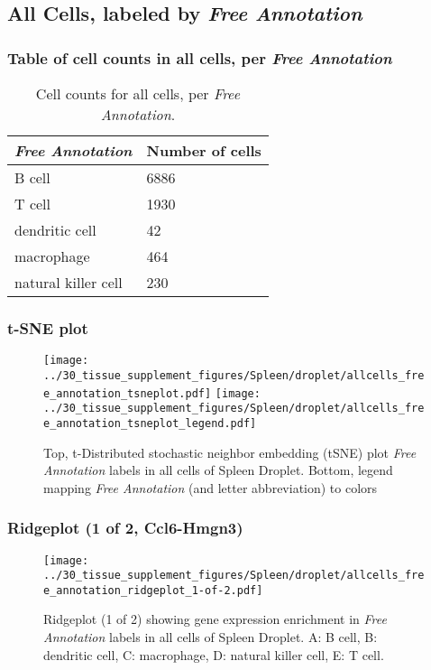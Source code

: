 \clearpage

\subsection{All Cells, labeled by \emph{Free Annotation}}
\subsubsection{Table of cell counts in all cells, per \emph{Free Annotation}}\begin{table}[h]
\centering
\label{my-label}
\begin{tabular}{@{}ll@{}}
\toprule

\emph{Free Annotation}& Number of cells \\ \midrule
B cell & 6886 \\

T cell & 1930 \\

dendritic cell & 42 \\

macrophage & 464 \\

natural killer cell & 230 \\
\bottomrule
\end{tabular}
\caption{Cell counts for all cells, per \emph{Free Annotation}.}
\end{table}

\clearpage
\subsubsection{t-SNE plot}
\begin{figure}[h]
\centering
\texttt{[image: ../30\_tissue\_supplement\_figures/Spleen/droplet/allcells\_free\_annotation\_tsneplot.pdf]}
\texttt{[image: ../30\_tissue\_supplement\_figures/Spleen/droplet/allcells\_free\_annotation\_tsneplot\_legend.pdf]}
\caption{Top, t-Distributed stochastic neighbor embedding (tSNE) plot  \emph{Free Annotation} labels in all cells of Spleen Droplet. Bottom, legend mapping \emph{Free Annotation} (and letter abbreviation) to colors}
\end{figure}


\clearpage

\subsubsection{Ridgeplot (1 of 2, Ccl6-Hmgn3)}
\begin{figure}[h]
\centering
\texttt{[image: ../30\_tissue\_supplement\_figures/Spleen/droplet/allcells\_free\_annotation\_ridgeplot\_1-of-2.pdf]}

\caption{ Ridgeplot (1 of 2)  showing gene expression enrichment in \emph{Free Annotation} labels in all cells of Spleen Droplet. A: B cell, B: dendritic cell, C: macrophage, D: natural killer cell, E: T cell.}
\end{figure}


